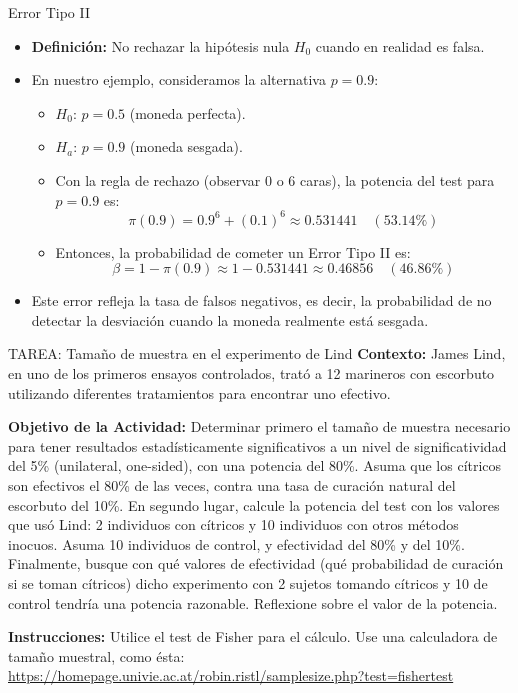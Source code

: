 ﻿\documentclass{beamer}
\begin{document}
\begin{frame}{Error Tipo II}
    \begin{itemize}
        \item \textbf{Definición:} No rechazar la hipótesis nula \(H_0\) cuando en realidad es falsa.
        \item En nuestro ejemplo, consideramos la alternativa \(p=0.9\):
        \begin{itemize}
            \item \(H_0\): \(p=0.5\) (moneda perfecta).
            \item \(H_a\): \(p=0.9\) (moneda sesgada).
            \item Con la regla de rechazo (observar 0 o 6 caras), la potencia del test para \(p=0.9\) es:
            \[
            \pi(0.9)=0.9^6 + (0.1)^6 \approx 0.531441 \quad (53.14\%)
            \]
            \item Entonces, la probabilidad de cometer un Error Tipo II es:
            \[
            \beta = 1 - \pi(0.9) \approx 1 - 0.531441 \approx 0.46856 \quad (46.86\%)
            \]
        \end{itemize}
        \item Este error refleja la tasa de falsos negativos, es decir, la probabilidad de no detectar la desviación cuando la moneda realmente está sesgada.
    \end{itemize}
\end{frame}




\begin{frame}{TAREA: Tamaño de muestra en el experimento de Lind}
    \textbf{Contexto:}
    James Lind, en uno de los primeros ensayos controlados, trató a 12 marineros con escorbuto utilizando diferentes tratamientos para encontrar uno efectivo.

    \textbf{Objetivo de la Actividad:}
    Determinar primero el tamaño de muestra necesario para tener resultados estadísticamente significativos a un nivel de significatividad del 5\% (unilateral, one-sided), con una potencia del 80\%. Asuma que los cítricos son efectivos el 80\% de las veces, contra una tasa de curación natural del escorbuto del 10\%. En segundo lugar, calcule la potencia del test con los valores que usó Lind: 2 individuos con cítricos y 10 individuos con otros métodos inocuos. Asuma 10 individuos de control, y efectividad del 80\% y del 10\%. Finalmente, busque con qué valores de efectividad (qué probabilidad de curación si se toman cítricos) dicho experimento con 2 sujetos tomando cítricos y 10 de control tendría una potencia razonable. Reflexione sobre el valor de la potencia. 

    \textbf{Instrucciones:}
    Utilice el test de Fisher para el cálculo. Use una calculadora de tamaño muestral, como ésta:
    \url{https://homepage.univie.ac.at/robin.ristl/samplesize.php?test=fishertest}
\end{frame}
\end{document}
